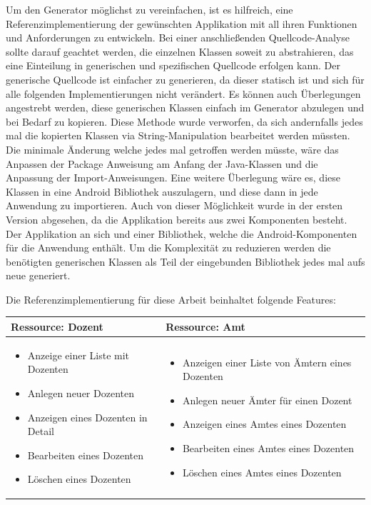 Um den Generator möglichst zu vereinfachen, ist es hilfreich, eine Referenzimplementierung der gewünschten Applikation mit all ihren Funktionen und Anforderungen zu entwickeln. Bei einer anschließenden Quellcode-Analyse sollte darauf geachtet werden, die einzelnen Klassen soweit zu abstrahieren, das eine Einteilung in generischen und spezifischen Quellcode erfolgen kann. Der generische Quellcode ist einfacher zu generieren, da dieser statisch ist und sich für alle folgenden Implementierungen nicht verändert. Es können auch Überlegungen angestrebt werden, diese generischen Klassen einfach im Generator abzulegen und bei Bedarf zu kopieren. Diese Methode wurde verworfen, da sich andernfalls jedes mal die kopierten Klassen via String-Manipulation bearbeitet werden müssten. Die minimale Änderung welche jedes mal getroffen werden müsste, wäre das Anpassen der Package Anweisung am Anfang der Java-Klassen und die Anpassung der Import-Anweisungen. Eine weitere Überlegung wäre es, diese Klassen in eine Android Bibliothek auszulagern, und diese dann in jede Anwendung zu importieren. Auch von dieser Möglichkeit wurde in der ersten Version abgesehen, da die Applikation bereits aus zwei Komponenten besteht. Der Applikation an sich und einer Bibliothek, welche die Android-Komponenten für die Anwendung enthält. Um die Komplexität zu reduzieren werden die benötigten generischen Klassen als Teil der eingebunden Bibliothek jedes mal aufs neue generiert.

Die Referenzimplementierung für diese Arbeit beinhaltet folgende Features:
\begin{center}
	\begin{tabular}{p{}|p{}}
		\textbf{Ressource: Dozent} & \textbf{Ressource: Amt} \\ \hline
		\begin{itemize}
			\item Anzeige einer Liste mit Dozenten
			\item Anlegen neuer Dozenten
			\item Anzeigen eines Dozenten in Detail
			\item Bearbeiten eines Dozenten
			\item Löschen eines Dozenten
		\end{itemize}
		&
		\begin{itemize}
			\item Anzeigen einer Liste von Ämtern eines Dozenten
			\item Anlegen neuer Ämter für einen Dozent
			\item Anzeigen eines Amtes eines Dozenten
			\item Bearbeiten eines Amtes eines Dozenten
			\item Löschen eines Amtes eines Dozenten
		\end{itemize}
		\\
	\end{tabular}
\end{center}

